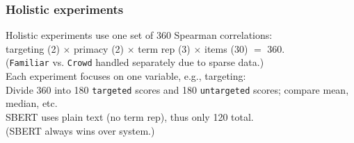 \documentclass[handout,xcolor={dvipsnames}]{beamer}
\newcommand{\param}[1]{\texttt{#1}}
\begin{document}
\begin{frame}
\frametitle{Holistic experiments}

\pause
Holistic experiments use one set of 360 Spearman correlations: \\
\vspace{.5em}
targeting (2) $\times$ primacy (2) $\times$ term rep (3) $\times$ items (30) $=$ 360. \\
\pause
\vspace{.5em}
\pause
(\param{Familiar} vs. \param{Crowd} handled separately due to sparse data.) \\

\pause
\vspace{1.4em}
Each experiment focuses on one variable, e.g., targeting: \\
\vspace{.5em}
Divide 360 into 180 \param{targeted} scores and 180 \param{untargeted} scores; compare mean, median, etc. \\

\pause
\vspace{1.4em}
SBERT uses plain text (no term rep), thus only 120 total. \\

\pause
\vspace{.5em}
(SBERT always wins over system.)
\end{frame}
\end{document}
